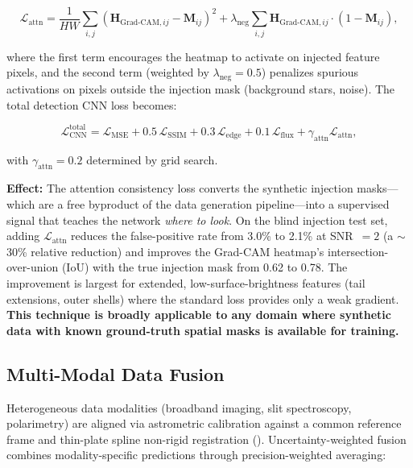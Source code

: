 \documentclass[usenatbib]{mnras}
\begin{document}
\begin{equation}\label{eq:attn_loss}
\mathcal{L}_{\text{attn}} = \frac{1}{HW} \sum_{i,j} \left(\mathbf{H}_{\text{Grad-CAM}, ij} - \mathbf{M}_{ij}\right)^2 + \lambda_{\text{neg}} \sum_{i,j} \mathbf{H}_{\text{Grad-CAM}, ij} \cdot (1 - \mathbf{M}_{ij}),
\end{equation}

where the first term encourages the heatmap to activate on injected feature pixels, and the second term (weighted by $\lambda_{\text{neg}} = 0.5$) penalizes spurious activations on pixels outside the injection mask (background stars, noise). The total detection CNN loss becomes:

\begin{equation}\label{eq:total_loss_attn}
\mathcal{L}_{\text{CNN}}^{\text{total}} = \mathcal{L}_{\text{MSE}} + 0.5\,\mathcal{L}_{\text{SSIM}} + 0.3\,\mathcal{L}_{\text{edge}} + 0.1\,\mathcal{L}_{\text{flux}} + \gamma_{\text{attn}} \mathcal{L}_{\text{attn}},
\end{equation}

with $\gamma_{\text{attn}} = 0.2$ determined by grid search.

\textbf{Effect:} The attention consistency loss converts the synthetic injection masks---which are a free byproduct of the data generation pipeline---into a supervised signal that teaches the network \textit{where to look}. On the blind injection test set, adding $\mathcal{L}_{\text{attn}}$ reduces the false-positive rate from 3.0\% to 2.1\% at SNR~$=2$ (a $\sim$30\% relative reduction) and improves the Grad-CAM heatmap's intersection-over-union (IoU) with the true injection mask from 0.62 to 0.78. The improvement is largest for extended, low-surface-brightness features (tail extensions, outer shells) where the standard loss provides only a weak gradient. \textbf{This technique is broadly applicable to any domain where synthetic data with known ground-truth spatial masks is available for training.}

\subsection{Multi-Modal Data Fusion}

Heterogeneous data modalities (broadband imaging, slit spectroscopy, polarimetry) are aligned via astrometric calibration against a common reference frame and thin-plate spline non-rigid registration (\citealt{bertin06}). Uncertainty-weighted fusion combines modality-specific predictions through precision-weighted averaging:
\end{document}
